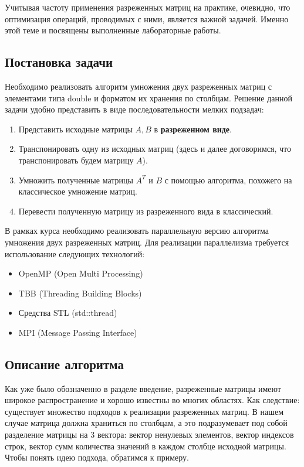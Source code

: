 \documentclass[12pt]{article}
\begin{document}
Учитывая частоту применения разреженных матриц на практике, очевидно, что оптимизация операций, проводимых с ними, является важной задачей. Именно этой теме и посвящены выполненные лабораторные работы.
\newpage
\begin{center}
    \section*{Постановка задачи}
\end{center}
Необходимо реализовать алгоритм умножения двух разреженных матриц с элементами типа double и форматом их хранения по столбцам. Решение данной задачи удобно представить в виде последовательности мелких подзадач:
\begin{enumerate}
    \item Представить исходные матрицы $A, B$ в \textbf{разреженном виде}.
    \item Транспонировать одну из исходных матриц (здесь и далее договоримся, что транспонировать будем матрицу $A$).
    \item Умножить полученные матрицы $A^T$ и $B$ с помощью алгоритма, похожего на классическое умножение матриц.
    \item Перевести полученную матрицу из разреженного вида в классический.
\end{enumerate}

В рамках курса необходимо реализовать параллельную версию алгоритма умножения двух разреженных матриц. Для реализации параллелизма требуется использование следующих технологий:
\begin{itemize}
    \item OpenMP (Open Multi Processing)
    \item TBB (Threading Building Blocks)
    \item Средства STL (std::thread)
    \item MPI (Message Passing Interface)
\end{itemize}
\newpage
\begin{center}
    \section*{Описание алгоритма}
\end{center}

Как уже было обозначенно в разделе введение, разреженные матрицы имеют широкое распространение и хорошо известны во многих областях. Как следствие: существует множество подходов к реализации разреженных матриц. В нашем случае матрица должна храниться по столбцам, а это подразумевает под собой разделение матрицы на 3 вектора: вектор ненулевых элементов, вектор индексов строк, вектор сумм количества значений в каждом столбце исходной матрицы. Чтобы понять идею подхода, обратимся к примеру.
\end{document}
